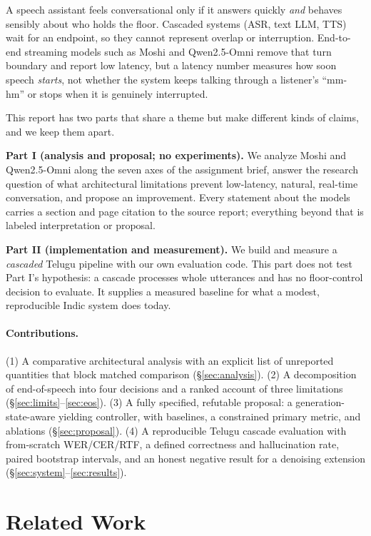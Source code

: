 \documentclass[11pt,a4paper,twocolumn]{article}
\begin{document}
A speech assistant feels conversational only if it answers quickly \emph{and} behaves sensibly about who holds the floor. Cascaded systems (ASR, text LLM, TTS) wait for an endpoint, so they cannot represent overlap or interruption. End-to-end streaming models such as Moshi \citep{moshi} and Qwen2.5-Omni \citep{qwenomni} remove that turn boundary and report low latency, but a latency number measures how soon speech \emph{starts}, not whether the system keeps talking through a listener's ``mm-hm'' or stops when it is genuinely interrupted.

This report has two parts that share a theme but make different kinds of claims, and we keep them apart.

\textbf{Part I (analysis and proposal; no experiments).} We analyze Moshi and Qwen2.5-Omni along the seven axes of the assignment brief, answer the research question of what architectural limitations prevent low-latency, natural, real-time conversation, and propose an improvement. Every statement about the models carries a section and page citation to the source report; everything beyond that is labeled interpretation or proposal.

\textbf{Part II (implementation and measurement).} We build and measure a \emph{cascaded} Telugu pipeline with our own evaluation code. This part does not test Part I's hypothesis: a cascade processes whole utterances and has no floor-control decision to evaluate. It supplies a measured baseline for what a modest, reproducible Indic system does today.

\paragraph{Contributions.}
(1) A comparative architectural analysis with an explicit list of unreported quantities that block matched comparison (\S\ref{sec:analysis}).
(2) A decomposition of end-of-speech into four decisions and a ranked account of three limitations (\S\ref{sec:limits}--\ref{sec:eos}).
(3) A fully specified, refutable proposal: a generation-state-aware yielding controller, with baselines, a constrained primary metric, and ablations (\S\ref{sec:proposal}).
(4) A reproducible Telugu cascade evaluation with from-scratch WER/CER/RTF, a defined correctness and hallucination rate, paired bootstrap intervals, and an honest negative result for a denoising extension (\S\ref{sec:system}--\ref{sec:results}).

\section{Related Work}
\end{document}
